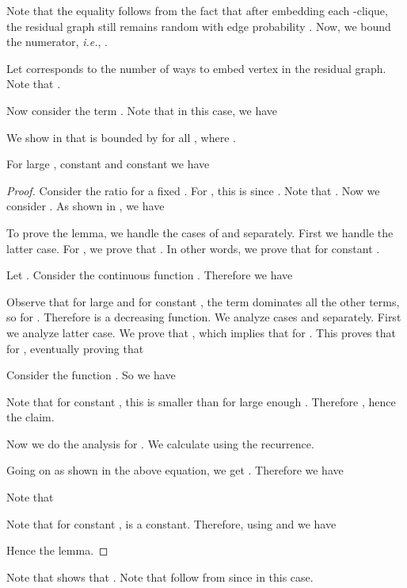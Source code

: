 \documentclass[runningheads,a4paper]{llncs}
\begin{document}
Note that the equality follows from the fact that after embedding each -clique, the residual graph still remains random with edge probability . Now, we bound the numerator, {\em i.e.}, .  


Let  corresponds to the number of ways to embed vertex  in the residual graph. Note that . 

Now consider the term . 
Note that in this case, we have 

We show in  that  is bounded by  for all , where . 
\begin{lemma}\label{lem:app-cri-rat-int-bound}
For large , constant   and constant  we have 
\end{lemma}

\begin{proof}
Consider the ratio  for a fixed . For , this is  since . Note that 
. Now we consider . 
As shown in , we have 


To prove the lemma, we handle the cases of  and   separately. First we handle the latter case. For , we prove that . In other words, we prove that  for constant .
 

Let .  Consider the continuous function 
. Therefore we have 


Observe that for large  and for constant , the term  dominates all the other terms, so  for . Therefore  is a decreasing function.  We analyze cases  and  separately.
First we analyze latter case.  We prove that , which implies that  for . This proves that  for  , eventually proving that
 

Consider the function . So we have 



Note that for constant , this is smaller than  for large enough . Therefore , hence the claim.

Now we do the analysis for . We calculate  using the recurrence. 


Going on as shown in the above equation, we get . Therefore we have


Note that 


Note that for constant ,  is a constant.
Therefore, using  and  we have 

Hence the lemma.
\end{proof}

Note that  shows that . Note that  follow from  since 
 in this case.
\end{document}
